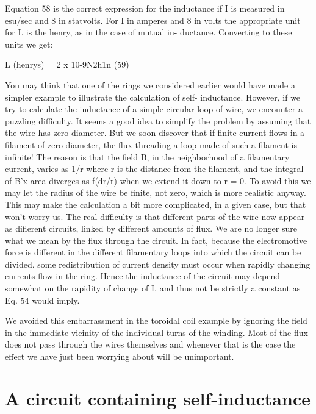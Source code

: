 Equation 58 is the correct expression for the inductance if I is measured
in esu/sec and 8 in statvolts. For I in amperes and 8 in volts
the appropriate unit for L is the henry, as in the case of mutual in-
ductance. Converting to these units we get:

\begin{equation}
\end{equation}
L (henrys) = 2 x 10-9N2h1n (59)

You may think that one of the rings we considered earlier would
have made a simpler example to illustrate the calculation of self-
inductance. However, if we try to calculate the inductance of a
simple circular loop of wire, we encounter a puzzling difficulty. It
seems a good idea to simplify the problem by assuming that the wire
has zero diameter. But we soon discover that if finite current flows
in a filament of zero diameter, the flux threading a loop made of such
a filament is infinite! The reason is that the field B, in the neighborhood
of a filamentary current, varies as 1/r where r is the distance
from the filament, and the integral of B'x area diverges as f(dr/r)
when we extend it down to r = 0. To avoid this we may let the radius
of the wire be finite, not zero, which is more realistic anyway. This
may make the calculation a bit more complicated, in a given case,
but that won't worry us. The real difficulty is that different parts of
the wire now appear as difierent circuits, linked by different amounts
of flux. We are no longer sure what we mean by the flux through the
circuit. In fact, because the electromotive force is different in the
different filamentary loops into which the circuit can be divided. some
redistribution of current density must occur when rapidly changing
currents flow in the ring. Hence the inductance of the circuit may
depend somewhat on the rapidity of change of I, and thus not be
strictly a constant as Eq. 54 would imply.

We avoided this embarrassment in the toroidal coil example by
ignoring the field in the immediate vicinity of the individual turns of
the winding. Most of the flux does not pass through the wires themselves
and whenever that is the case the effect we have just been
worrying about will be unimportant.

\section{A circuit containing self-inductance}

